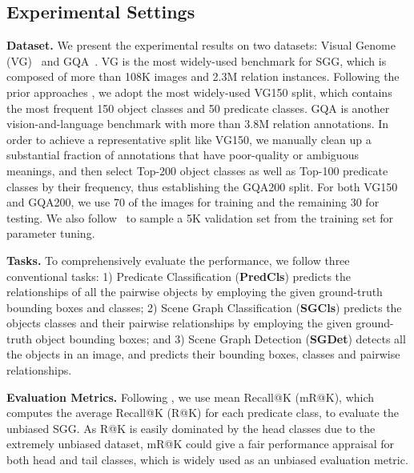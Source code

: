 \documentclass[10pt,twocolumn,letterpaper]{article}
\begin{document}
{\subsection{Experimental Settings}
\noindent\textbf{Dataset.}
We present the experimental results on two datasets: Visual Genome (VG)~\cite{krishna2016visual} and GQA~\cite{hudson2019gqa}. VG is the most widely-used benchmark for SGG, which is composed of more than 108K images and 2.3M relation instances. Following the prior approaches \cite{xu2017scene, chen2019knowledge, lin2020gps, yan2020pcpl, zhang2017visual, li2021bipartite, zellers2018neural, tang2019learning, tang2020unbiased, yu2020cogtree, chiou2021recovering, suhail2021energy}, we adopt the most widely-used VG150 split, which contains the most frequent 150 object classes and 50 predicate classes. GQA is another vision-and-language benchmark with more than 3.8M relation annotations. In order to achieve a representative split like VG150, we manually clean up a substantial fraction of annotations that have poor-quality or ambiguous meanings, and then select Top-200 object classes as well as Top-100 predicate classes by their frequency, thus establishing the GQA200 split. For both VG150 and GQA200, we use 70 of the images for training and the remaining 30 for testing. We also follow~\cite{zellers2018neural} to sample a 5K validation set from the training set for parameter tuning.

\noindent\textbf{Tasks.}
To comprehensively evaluate the performance, we follow three conventional tasks: 1) Predicate Classification (\textbf{PredCls}) predicts the relationships of all the pairwise objects by employing the given ground-truth bounding boxes and classes; 2) Scene Graph Classification (\textbf{SGCls}) predicts the objects classes and their pairwise relationships by employing the given ground-truth object bounding boxes; and 3) Scene Graph Detection (\textbf{SGDet}) detects all the objects in an image, and predicts their bounding boxes, classes and pairwise relationships.

\noindent\textbf{Evaluation Metrics.} Following \cite{yan2020pcpl, lin2020gps, li2021bipartite, tang2020unbiased, yu2020cogtree, chiou2021recovering, suhail2021energy}, we use mean Recall@K
(mR@K)\cite{tang2019learning,chen2019knowledge}, which computes the average Recall@K (R@K) for each predicate class, to evaluate the unbiased SGG. As R@K is easily dominated by the head classes due to the extremely unbiased dataset, mR@K could give a fair performance appraisal for both head and tail classes, which is widely used as an unbiased evaluation metric.

}
\end{document}
